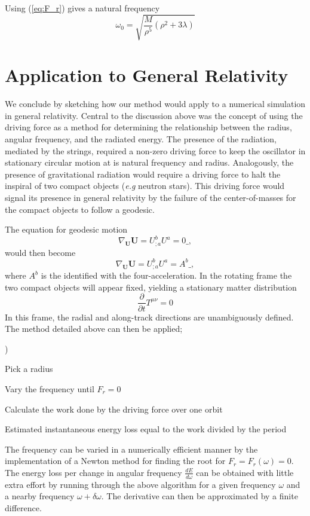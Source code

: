 Using (\ref{eq:F_r}) gives a natural frequency
\[
  \omega _0 = \sqrt{\frac{M}{\rho^5}\left(\rho^2 + 3 \lambda \right)  }
\]

 
\section{Application to General Relativity}

We conclude by sketching how our method would apply to a numerical simulation
in general relativity.  Central to the discussion above was the concept of using
the driving force as a method for determining the relationship between the 
radius, angular frequency, and the radiated energy.  The presence of the 
radiation, mediated by the strings, required a non-zero driving force to keep 
the oscillator in stationary circular motion at is natural frequency and 
radius.  Analogously, the presence of gravitational radiation would require a
driving force to halt the inspiral of two compact objects 
(\emph{e.g} neutron stars).  This driving force would signal its presence in 
general relativity by the failure of the center-of-masses for the compact 
objects to follow a geodesic.

The equation for geodesic motion
\[
   \nabla_{\mathbf{U}} \mathbf{U} = U^{b}_{;a} U^a = 0 \_,
\]
would then become
\[
   \nabla_{\mathbf{U}} \mathbf{U} = U^{b}_{;a} U^a = A^b \_,
\]
where $A^b$ is the identified with the four-acceleration.  In the rotating frame 
the two compact objects will appear fixed, yielding a stationary matter 
distribution 
\[
   \frac{\partial}{\partial t} T^{\mu \nu} = 0
\]
In this frame, the radial and along-track directions are 
unambiguously defined.  The method detailed above can then be applied;
%
\begin{list}
   {)}{
    \setlength{\rightmargin}{\leftmargin}}
	\item Pick a radius 
 	\item Vary the frequency until $F_r = 0$
	\item Calculate the work done by the driving force over one orbit 
	\item Estimated instantaneous energy loss equal to the work divided by 
	      the period
\end{list}
%
The frequency can be varied in a numerically efficient manner by the 
implementation of a Newton method for finding the root for $F_r = F_r(\omega) 
= 0$.  The energy loss per change in angular frequency $\frac{dE}{d \omega}$ can
be obtained with little extra effort by running through the above algorithm for
a given frequency $\omega$ and a nearby frequency $\omega + \delta \omega$.  The
derivative can then be approximated by a finite difference.






